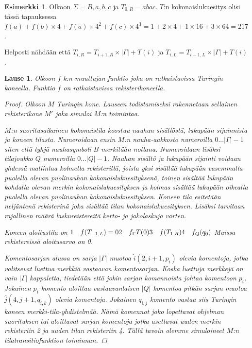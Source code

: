 \documentclass[a4paper, 12pt]{article}
\theoremstyle{definition}
\newtheorem{example}[mydef]{Esimerkki}
\theoremstyle{plain}
\newtheorem{teor}[mydef]{Lause}
\begin{document}
\begin{example}
Olkoon $\Sigma = {B, a, b, c}$ ja $T_{0, R} = abac$. $T$:n kokonaislukuesitys olisi tässä tapauksessa $f(a) + f(b) \times 4 + f(a) \times 4^2 + f(c) \times 4^3= 1 + 2 \times 4 + 1 \times 16 + 3 \times 64 = 217$.
\end{example}

Helposti nähdään että $T_{i,R} = T_{i+1,R} \times |\Gamma| + T(i)$ ja $T_{i,L} = T_{i-1,L} \times |\Gamma| + T(i)$.


\begin{teor}
Olkoon $f$ k:n muuttujan funktio joka on ratkaistavissa Turingin koneella. Funktio $f$ on ratkaistavissa rekisterikoneella.
\begin{proof}
Olkoon $M$ Turingin kone. Lauseen todistamiseksi rakennetaan sellainen rekisterikone $M'$ joka simuloi $M$:n toimintaa.

$M$:n suoritusaikainen kokonaistila koostuu nauhan sisällöstä, lukupään sijainnista ja koneen tilasta. Numeroidaan ensin $M$:n nauha-aakkosto numeroilla $0 ... |\Gamma|-1$ siten että tyhjä nauhasymboli $B$ merkitään nollana. Numeroidaan lisäksi tilajoukko $Q$ numeroilla $0 ... |Q| - 1$. Nauhan sisältö ja lukupään sijainti voidaan yhdessä mallintaa kolmella rekisterillä, joista yksi sisältää lukupään vasemmalla puolella olevan puolinauhan kokonaislukuesityksenä, toinen sisältää lukupään kohdalla olevan merkin kokonaislukuesityksen ja kolmas sisältää lukupään oikealla puolella olevan puolinauhan kokonaislukuesityksen. Koneen tila esitetään neljäntenä rekisterinä joka sisältää tilan kokonaislukuesityksen. Lisäksi tarvitaan rajallinen määrä laskureistereitä kerto- ja jakolaskuja varten.

Koneen aloitustila on
\begin{math} \\
1\quad f(T_{-1, L}) = 0 \\
2\quad f_{\Gamma}T(0) \\
3\quad f(T_{1, R})\\
4\quad f_Q(q_0)\\
\end{math}
Muissa rekistereissä aloitusarvo on 0.

Komentosarjan alussa on sarja $|\Gamma|$ muotoa $\hat{i} (2, i+1, p_i)$ olevia komentoja, jotka valitsevat luettua merkkiä vastaavan komentosarjan. Koska luettuja merkkejä on vain $|\Gamma|$ kappaletta, tiedetään että jokin sarjan komennoista johtaa komentoon $p_i$. Jokainen $p_i$-komento aloittaa vastaavanlaisen $|Q|$ komentoa pitkän sarjan muotoa $\hat{j} (4, j+1, q_{i,k})$  olevia komentoja. Jokainen $q_{i,j}$ komento vastaa siis Turingin koneen merkki-tila-yhdistelmää. Nämä komennot joko lopettavat ohjelman suorituksen tai aloittavat sarjan komentoja jotka asettavat uuden merkin rekisteriin 2 ja uuden tilan rekisteriin 4. Tällä tavoin olemme simuloineet $M$:n tilatransitiofunktion toiminnan.


\end{proof}
\end{teor}
\end{document}
